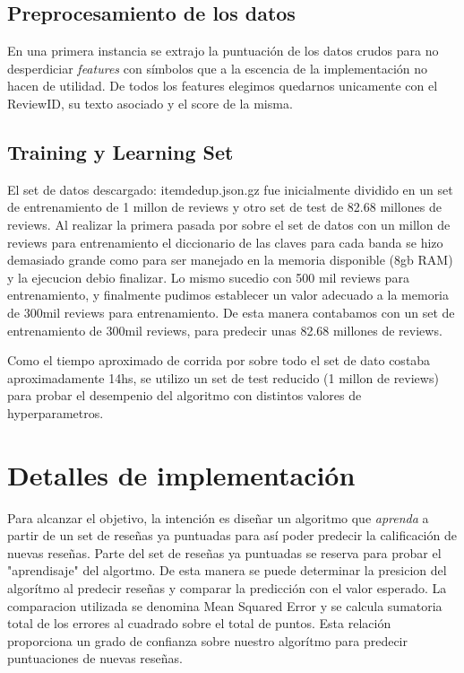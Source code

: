 \documentclass[a4paper,10pt]{article}
\begin{document}
	\subsection{Preprocesamiento de los datos}	

	En una primera instancia se extrajo la puntuaci\'{o}n de los datos crudos para no desperdiciar \textit{features} con s\'{i}mbolos que a la escencia de la implementaci\'{o}n no hacen de utilidad. De todos los features elegimos quedarnos unicamente con el ReviewID, su texto asociado y el score de la misma. 
	
	
	\subsection{Training y Learning Set}
	
	El set de datos descargado: itemdedup.json.gz fue inicialmente dividido en un set de entrenamiento de 1 millon de reviews y otro set de test de 82.68 millones de reviews. Al realizar la primera pasada por sobre el set de datos con un millon de reviews para entrenamiento el diccionario de las claves para cada banda se hizo demasiado grande como para ser manejado en la memoria disponible (8gb RAM) y la ejecucion debio finalizar. Lo mismo sucedio con 500 mil reviews para entrenamiento, y finalmente pudimos establecer un valor adecuado a la memoria de 300mil reviews para entrenamiento. De esta manera contabamos con un set de entrenamiento de 300mil reviews, para predecir unas 82.68 millones de reviews.
	
	Como el tiempo aproximado de corrida por sobre todo el set de dato costaba aproximadamente 14hs, se utilizo un set de test reducido (1 millon de reviews) para probar el desempenio del algoritmo con distintos valores de hyperparametros.
	
	\section{Detalles de implementaci\'{o}n}
	
	Para alcanzar el objetivo, la intenci\'{o}n es dise\~{n}ar un algoritmo que \textit{aprenda} a partir de un set de rese\~{n}as ya puntuadas para as\'{i} poder predecir la calificaci\'{o}n de nuevas rese\~{n}as. Parte del set de rese\~{n}as ya puntuadas se reserva para probar el "aprendisaje" del algortmo. De esta manera se puede determinar la presicion del algor\'{i}tmo al predecir rese\~{n}as y comparar la predicci\'{o}n con el valor esperado. La comparacion utilizada se denomina Mean Squared Error y se calcula sumatoria total de los errores al cuadrado sobre el total de puntos. Esta relaci\'{o}n proporciona un grado de confianza sobre nuestro algor\'{i}tmo para predecir puntuaciones de nuevas rese\~{n}as.
\end{document}
